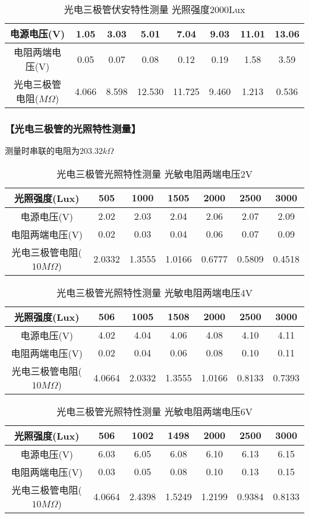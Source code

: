 \documentclass{ctexart}
\let\oldsubsubsection\subsubsection
\renewcommand{\subsubsection}[1]{\oldsubsubsection{\!\!\!\!\!\!【#1】}}
\begin{document}
\begin{table}[H]
  \centering
  \begin{tabular}{|c|c|c|c|c|c|c|c|}
    \hline
    电源电压(V) &1.05&3.03&5.01&7.04&9.03&11.01&13.06\\\hline
    电阻两端电压(V) &0.05&0.07&0.08&0.12&0.19&1.58&3.59\\\hline
    光电三极管电阻($M\Omega$) & 4.066&8.598&12.530&11.725&9.460&1.213&0.536\\\hline
  \end{tabular}
  \caption{光电三极管伏安特性测量 光照强度2000Lux}
\end{table}

\subsubsection{光电三极管的光照特性测量}

测量时串联的电阻为$203.32k\Omega$

\begin{table}[H]
  \centering
  \begin{tabular}{|c|c|c|c|c|c|c|}
    \hline
    光照强度(Lux) &505&1000&1505&2000&2500&3000\\\hline
    电源电压(V) &2.02&2.03&2.04&2.06&2.07&2.09\\\hline
    电阻两端电压(V) &0.02&0.03&0.04&0.06&0.07&0.09\\\hline
    光电三极管电阻($10M\Omega$) &2.0332&1.3555&1.0166&0.6777&0.5809&0.4518 \\\hline
  \end{tabular}
  \caption{光电三极管光照特性测量 光敏电阻两端电压2V}
\end{table}

\begin{table}[H]
  \centering
  \begin{tabular}{|c|c|c|c|c|c|c|}
    \hline
    光照强度(Lux) &506&1005&1508&2000&2500&3000\\\hline
    电源电压(V) &4.02&4.04&4.06&4.08&4.10&4.11\\\hline
    电阻两端电压(V) &0.02&0.04&0.06&0.08&0.10&0.11\\\hline
    光电三极管电阻($10M\Omega$) &4.0664&2.0332&1.3555&1.0166&0.8133&0.7393 \\\hline
  \end{tabular}
  \caption{光电三极管光照特性测量 光敏电阻两端电压4V}
\end{table}

\begin{table}[H]
  \centering
  \begin{tabular}{|c|c|c|c|c|c|c|}
    \hline
    光照强度(Lux) &506&1002&1498&2000&2500&3000\\\hline
    电源电压(V) &6.03&6.05&6.08&6.10&6.13&6.15\\\hline
    电阻两端电压(V) &0.03&0.05&0.08&0.10&0.13&0.15\\\hline
    光电三极管电阻($10M\Omega$) &4.0664&2.4398&1.5249&1.2199&0.9384&0.8133 \\\hline
  \end{tabular}
  \caption{光电三极管光照特性测量 光敏电阻两端电压6V}
\end{table}
\end{document}
